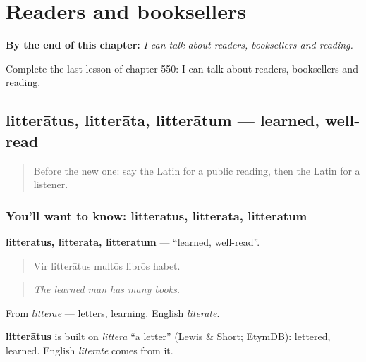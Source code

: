 
\chapter{Readers and booksellers}
\label{ch:la-readers-and-booksellers}

\begin{chapteropening}
\textbf{By the end of this chapter:} \emph{I can talk about readers, booksellers and reading.}

Complete the last lesson of chapter 550: I can talk about readers, booksellers and reading.
\end{chapteropening}

\section[litterātus, litterāta, litterātum]{litterātus, litterāta, litterātum — learned, well-read}

\label{lesson:LA-C550-litteratus}



\begin{quote}
Before the new one: say the Latin for a public reading, then the Latin for a listener.
\end{quote}

\subsection*{You'll want to know: litterātus, litterāta, litterātum}
\textbf{litterātus, litterāta, litterātum} — \textquotedblleft{}learned, well-read\textquotedblright{}.

\begin{quote}
Vir litterātus multōs librōs habet.
\end{quote}

\begin{quote}
\emph{The learned man has many books.}
\end{quote}

From \emph{litterae} — letters, learning. English \emph{literate}.

\begin{cousinweb}
\textbf{litterātus} is built on \emph{littera} \textquotedblleft{}a letter\textquotedblright{} (Lewis \& Short; EtymDB): lettered, learned. English \emph{literate} comes from it.
\end{cousinweb}

